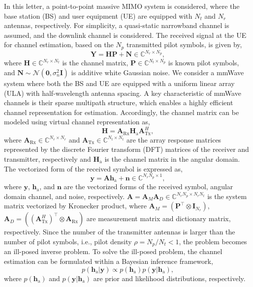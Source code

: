 \documentclass[lettersize,journal]{IEEEtran}
\begin{document}
In this letter, a point-to-point massive MIMO system is considered, where the base station (BS) and user equipment (UE) are equipped with $N_{t}$ and $N_{r}$ antennas, respectively. For simplicity, a quasi-static narrowband channel is assumed, and the downlink channel is considered. The received signal at the UE for channel estimation, based on the $N_{p}$ transmitted pilot symbols, is given by,
\begin{equation}
\mathbf{Y}=\mathbf{H}\mathbf{P}+\mathbf{N}\in \mathbb{C}^{N_{r}\times N_{p}},
\end{equation}
where $\mathbf{H}\in \mathbb{C}^{N_{r}\times N_{t}}$ is the channel matrix, $\mathbf{P}\in \mathbb{C}^{N_{t}\times N_{p}}$ is known pilot symbols, and $\mathbf{N}\sim\mathcal{N}(\mathbf{0},\sigma^{2}_{n}\mathbf{I})$ is additive white Gaussian noise. We consider a mmWave system where both the BS and UE are equipped with a uniform linear array (ULA) with half-wavelength antenna spacing. A key characteristic of mmWave channels is their sparse multipath structure, which enables a highly efficient channel representation for estimation. Accordingly, the channel matrix can be modeled using virtual channel representation as,
\begin{equation}
\mathbf{H} = \mathbf{A}_{\text{Rx}}\mathbf{H}_{\text{a}}\mathbf{A}_{\text{Tx}}^{H},
\end{equation}
where $\mathbf{A}_{\text{Rx}}\in \mathbb{C}^{N_{r}\times N_{r}}$ and $\mathbf{A}_{\text{Tx}}\in \mathbb{C}^{N_{t}\times N_{t}}$ are the array response matrices represented by the discrete Fourier transform (DFT) matrices of the receiver and transmitter, respectively and $\mathbf{H}_{\text{a}}$ is the channel matrix in the angular domain.
The vectorized form of the received symbol is expressed as,
\begin{equation}
\mathbf{y} = \mathbf{A}\mathbf{h}_{\text{a}}+\mathbf{n}\in \mathbb{C}^{N_{r}N_{p}\times 1},
\end{equation}
where $\mathbf{y}$, $\mathbf{h}_{\text{a}}$, and $\mathbf{n}$ are the vectorized forms of the received symbol, angular domain channel, and noise, respectively. $\mathbf{A}=\mathbf{A}_{M}\mathbf{A}_{D}\in \mathbb{C}^{N_{r}N_{p}\times N_{r}N_{t}}$ is the system matrix vectorized by Kronecker product, where $\mathbf{A}_{M} = (\mathbf{P}^{\top}\otimes\mathbf{I}_{N_{r}})$, $\mathbf{A}_{D}=((\mathbf{A}_{\text{Tx}}^{H})^{\top}\otimes \mathbf{A}_{\text{Rx}})$ are measurement matrix and dictionary matrix, respectively.
Since the number of the transmitter antennas is larger than the number of pilot symbols, i.e., pilot density $\rho=N_{p}/N_{t}<1$, the problem becomes an ill-posed inverse problem.
To solve the ill-posed problem, the channel estimation can be formulated within a Bayesian inference framework,
\begin{equation}
  p(\mathbf{h}_{\text{a}}|\mathbf{y})\propto p(\mathbf{h}_{\text{a}})p(\mathbf{y}|\mathbf{h}_{\text{a}}),
\end{equation}
where $p(\mathbf{h}_{\text{a}})$ and $p(\mathbf{y}|\mathbf{h}_{\text{a}})$ are prior and likelihood distributions, respectively.
\end{document}
